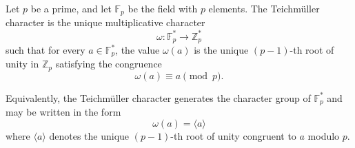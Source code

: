 Let $p$ be a prime, and let $\mathbb{F}_p$ be the field with $p$ elements. The Teichmüller character is the unique multiplicative character
$$\omega: \mathbb{F}_p^* \to \mathbb{Z}_p^*$$
such that for every $a \in \mathbb{F}_p^*$, the value $\omega(a)$ is the unique $(p-1)$-th root of unity in $\mathbb{Z}_p$ satisfying the congruence
$$\omega(a) \equiv a \pmod{p}.$$

Equivalently, the Teichmüller character generates the character group of $\mathbb{F}_p^*$ and may be written in the form
$$\omega(a) = \langle a \rangle$$
where $\langle a \rangle$ denotes the unique $(p-1)$-th root of unity congruent to $a$ modulo $p$.
